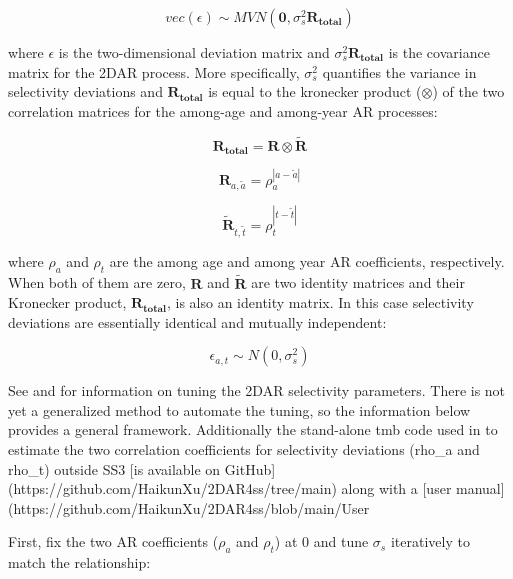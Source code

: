 \begin{equation}
vec(\epsilon) \sim MVN(\mathbf{0},\sigma_s^2\mathbf{R_{total}})
\end{equation}

where $\epsilon$ is the two-dimensional deviation matrix and $\sigma_s^2\mathbf{R_{total}}$ is the covariance matrix for the 2DAR process. More specifically, $\sigma_s^2$ quantifies the variance in selectivity deviations and $\mathbf{R_{total}}$ is equal to the kronecker product ($\otimes$) of the two correlation matrices for the among-age and among-year AR processes:

\begin{equation}
\mathbf{R_{total}}=\mathbf{R}\otimes\mathbf{\tilde{R}}
\end{equation}

\begin{equation}
\mathbf{R}_{a,\tilde{a}}=\rho_a^{|a-\tilde{a}|}
\end{equation}

\begin{equation}
\mathbf{\tilde{R}}_{t,\tilde{t}}=\rho_t^{|t-\tilde{t}|}
\end{equation}

where $\rho_a$ and $\rho_t$ are the among age and among year AR coefficients, respectively. When both of them are zero, $\mathbf{R}$ and $\mathbf{\tilde{R}}$ are two identity matrices and their Kronecker product, $\mathbf{R_{total}}$, is also an identity matrix. In this case selectivity deviations are essentially identical and mutually independent:

\begin{equation}
\epsilon_{a,t}\sim N(0,\sigma_s^2)
\end{equation} 

See \citet{xu-new-2019} and \citet{xu-comparing-2020} for information on tuning the 2DAR selectivity parameters. There is not yet a generalized method to automate the tuning, so the information below provides a general framework. Additionally the stand-alone \gls{tmb} code used in \citet{xu-new-2019} to estimate the two correlation coefficients for selectivity deviations (rho\_a and rho\_t) outside SS3 [is available on GitHub](https://github.com/HaikunXu/2DAR4ss/tree/main) along with a [user manual](https://github.com/HaikunXu/2DAR4ss/blob/main/User%

First, fix the two AR coefficients ($\rho_a$ and $\rho_t$) at 0 and tune $\sigma_s$ iteratively to match the relationship:

